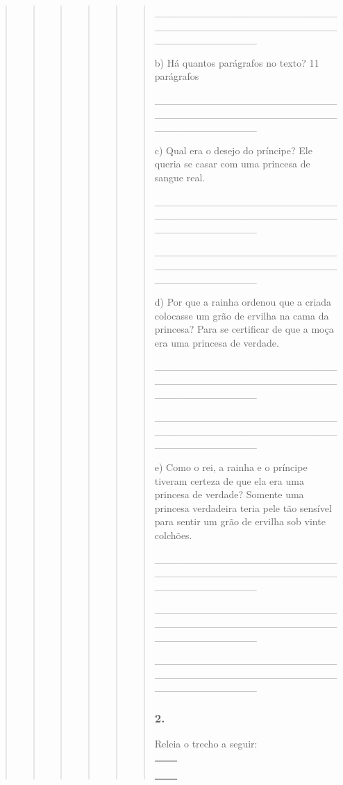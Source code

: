 \begin{quote}
\begin{quote}
\begin{quote}
\begin{quote}
\begin{quote}
\begin{quote}
\_\_\_\_\_\_\_\_\_\_\_\_\_\_\_\_\_\_\_\_\_\_\_\_\_\_\_\_\_\_\_\_\_\_\_\_\_\_\_\_\_\_\_\_\_\_\_\_\_\_\_\_\_\_\_\_\_\_\_\_\_\_\_\_

b) Há quantos parágrafos no texto? 11 parágrafos

\_\_\_\_\_\_\_\_\_\_\_\_\_\_\_\_\_\_\_\_\_\_\_\_\_\_\_\_\_\_\_\_\_\_\_\_\_\_\_\_\_\_\_\_\_\_\_\_\_\_\_\_\_\_\_\_\_\_\_\_\_\_\_\_

c) Qual era o desejo do príncipe? Ele queria se casar com uma princesa
de sangue real.

\_\_\_\_\_\_\_\_\_\_\_\_\_\_\_\_\_\_\_\_\_\_\_\_\_\_\_\_\_\_\_\_\_\_\_\_\_\_\_\_\_\_\_\_\_\_\_\_\_\_\_\_\_\_\_\_\_\_\_\_\_\_\_\_

\_\_\_\_\_\_\_\_\_\_\_\_\_\_\_\_\_\_\_\_\_\_\_\_\_\_\_\_\_\_\_\_\_\_\_\_\_\_\_\_\_\_\_\_\_\_\_\_\_\_\_\_\_\_\_\_\_\_\_\_\_\_\_\_

d) Por que a rainha ordenou que a criada colocasse um grão de ervilha na
cama da princesa? Para se certificar de que a moça era uma princesa de
verdade.

\_\_\_\_\_\_\_\_\_\_\_\_\_\_\_\_\_\_\_\_\_\_\_\_\_\_\_\_\_\_\_\_\_\_\_\_\_\_\_\_\_\_\_\_\_\_\_\_\_\_\_\_\_\_\_\_\_\_\_\_\_\_\_\_

\_\_\_\_\_\_\_\_\_\_\_\_\_\_\_\_\_\_\_\_\_\_\_\_\_\_\_\_\_\_\_\_\_\_\_\_\_\_\_\_\_\_\_\_\_\_\_\_\_\_\_\_\_\_\_\_\_\_\_\_\_\_\_\_

e) Como o rei, a rainha e o príncipe tiveram certeza de que ela era uma
princesa de verdade? Somente uma princesa verdadeira teria pele tão
sensível para sentir um grão de ervilha sob vinte colchões.

\_\_\_\_\_\_\_\_\_\_\_\_\_\_\_\_\_\_\_\_\_\_\_\_\_\_\_\_\_\_\_\_\_\_\_\_\_\_\_\_\_\_\_\_\_\_\_\_\_\_\_\_\_\_\_\_\_\_\_\_\_\_\_\_

\_\_\_\_\_\_\_\_\_\_\_\_\_\_\_\_\_\_\_\_\_\_\_\_\_\_\_\_\_\_\_\_\_\_\_\_\_\_\_\_\_\_\_\_\_\_\_\_\_\_\_\_\_\_\_\_\_\_\_\_\_\_\_\_

\_\_\_\_\_\_\_\_\_\_\_\_\_\_\_\_\_\_\_\_\_\_\_\_\_\_\_\_\_\_\_\_\_\_\_\_\_\_\_\_\_\_\_\_\_\_\_\_\_\_\_\_\_\_\_\_\_\_\_\_\_\_\_\_

\subsubsection{2. }\label{section-72}

Releia o trecho a seguir:

\begin{longtable}[]{@{}l@{}}
\toprule
\begin{minipage}[t]{0.97\columnwidth}\raggedright\strut
~ ~


\end{minipage}
\end{longtable}
\end{quote}
\end{quote}
\end{quote}
\end{quote}
\end{quote}
\end{quote}
